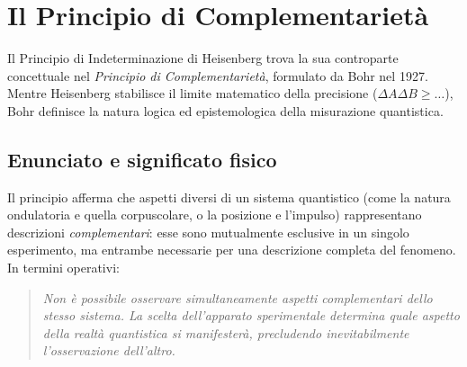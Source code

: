 \documentclass[a4paper,11pt]{report}
\begin{document}
\section{Il Principio di Complementarietà}
Il Principio di Indeterminazione di Heisenberg trova la sua controparte concettuale nel \textit{Principio di Complementarietà}, formulato da Bohr nel 1927.
Mentre Heisenberg stabilisce il limite matematico della precisione ($\Delta A \Delta B \ge \dots$), Bohr definisce la natura logica ed epistemologica della misurazione quantistica.

\subsection{Enunciato e significato fisico}
Il principio afferma che aspetti diversi di un sistema quantistico (come la natura ondulatoria e quella corpuscolare, o la posizione e l'impulso) rappresentano descrizioni \textit{complementari}: esse sono mutualmente esclusive in un singolo esperimento, ma entrambe necessarie per una descrizione completa del fenomeno.
In termini operativi:
\begin{quote}
    \textit{Non è possibile osservare simultaneamente aspetti complementari dello stesso sistema. La scelta dell'apparato sperimentale determina quale aspetto della realtà quantistica si manifesterà, precludendo inevitabilmente l'osservazione dell'altro.}
\end{quote}
\end{document}

